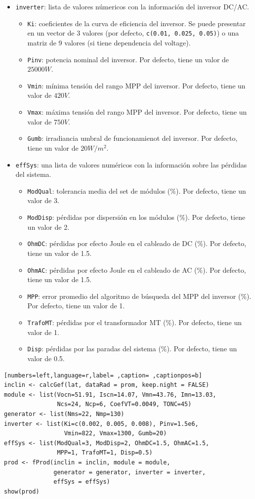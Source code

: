 \begin{itemize}
\begin{itemize}
\begin{itemize}
\end{itemize}
\item \texttt{inverter}: lista de valores númericos con la información del inversor DC/AC.
\begin{itemize}
\item \texttt{Ki}: coeficientes de la curva de eficiencia del inversor. Se puede presentar en un vector de 3 valores (por defecto, \texttt{c(0.01, 0.025, 0.05)}) o una matriz de 9 valores (si tiene dependencia del voltage).
\item \texttt{Pinv}: potencia nominal del inversor. Por defecto, tiene un valor de \(25000 W\).
\item \texttt{Vmin}: mínima tensión del rango MPP del inversor. Por defecto, tiene un valor de \(420V\).
\item \texttt{Vmax}: máxima tensión del rango MPP del inversor. Por defecto, tiene un valor de \(750V\).
\item \texttt{Gumb}: irradiancia umbral de funcionamienot del inversor. Por defecto, tiene un valor de \(20W/m^2\).
\end{itemize}
\item \texttt{effSys}: una lista de valores numéricos con la información sobre las pérdidas del sistema.
\begin{itemize}
\item \texttt{ModQual}: tolerancia media del set de módulos (\(\%\)). Por defecto, tiene un valor de 3.
\item \texttt{ModDisp}: pérdidas por dispersión en los módulos (\(\%\)). Por defecto, tiene un valor de 2.
\item \texttt{OhmDC}: pérdidas por efecto Joule en el cableado de DC (\(\%\)). Por defecto, tiene un valor de 1.5.
\item \texttt{OhmAC}: pérdidas por efecto Joule en el cableado de AC (\(\%\)). Por defecto, tiene un valor de 1.5.
\item \texttt{MPP}: error promedio del algoritmo de búsqueda del MPP del inversor (\(\%\)). Por defecto, tiene un valor de 1.
\item \texttt{TrafoMT}: pérdidas por el transformador MT (\(\%\)). Por defecto, tiene un valor de 1.
\item \texttt{Disp}: pérdidas por las paradas del sistema (\(\%\)). Por defecto, tiene un valor de 0.5.
\end{itemize}
\end{itemize}
\end{itemize}
\begin{lstlisting}[numbers=left,language=r,label= ,caption= ,captionpos=b]
inclin <- calcGef(lat, dataRad = prom, keep.night = FALSE)
module <- list(Vocn=51.91, Iscn=14.07, Vmn=43.76, Imn=13.03,
               Ncs=24, Ncp=6, CoefVT=0.0049, TONC=45)
generator <- list(Nms=22, Nmp=130)
inverter <- list(Ki=c(0.002, 0.005, 0.008), Pinv=1.5e6,
                 Vmin=822, Vmax=1300, Gumb=20)
effSys <- list(ModQual=3, ModDisp=2, OhmDC=1.5, OhmAC=1.5,
               MPP=1, TrafoMT=1, Disp=0.5)
prod <- fProd(inclin = inclin, module = module,
              generator = generator, inverter = inverter,
              effSys = effSys)
show(prod)
\end{lstlisting}

